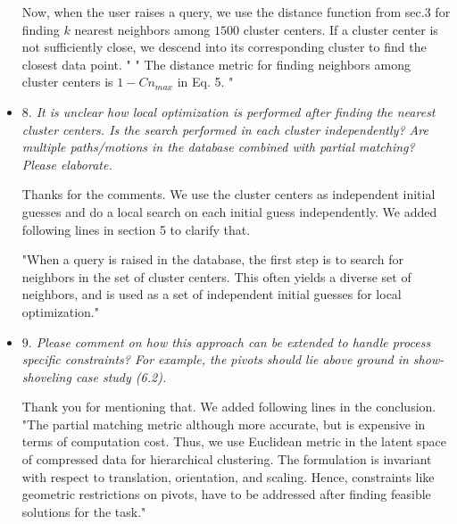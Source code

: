 \documentclass{article}
\begin{document}
\begin{itemize}
Now, when the user raises a query, we use the distance function from sec.3 for finding $k$ nearest neighbors among $1500$ cluster centers.
If a cluster center is not sufficiently close, we descend into its corresponding cluster to find the closest data point. "
" The distance metric for finding neighbors among cluster centers is $1-Cn_{max}$ in Eq. 5.  "
\\

  \item \emph{
$8.$ It is unclear how local optimization is performed after finding the nearest cluster centers. Is the
search performed in each cluster independently? Are multiple paths/motions in the database
combined with partial matching? Please elaborate.
}

Thanks for the comments.
We use the cluster centers as independent initial guesses and do a local search on each initial guess independently.
We added following lines in section 5 to clarify that.

"When a query is raised in the database, the first step is to search for neighbors in the set of cluster centers.
This often yields a diverse set of neighbors, and is used as a set of independent initial guesses for local optimization."
\\


  \item \emph{
$9.$ Please comment on how this approach can be extended to handle process specific constraints?
For example, the pivots should lie above ground in show-shoveling case study (6.2).
}

Thank you for mentioning that. We added following lines in the conclusion.
"The partial matching metric although more accurate, but is expensive in terms of computation cost.
Thus, we use Euclidean metric in the latent space of compressed data for hierarchical clustering.
The formulation is invariant with respect to translation, orientation, and scaling.
Hence, constraints like geometric restrictions on pivots, have to be addressed after finding feasible solutions for the task."

\end{itemize}



\end{document}
